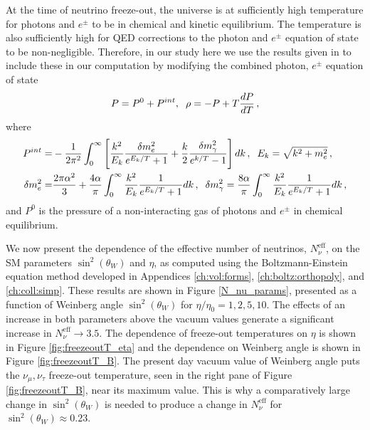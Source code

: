 At the time of neutrino freeze-out, the universe is at sufficiently high temperature for photons and $e^\pm$ to be in chemical and kinetic equilibrium.  The temperature is also sufficiently high for QED corrections to the photon and $e^\pm$ equation of state to be non-negligible.  Therefore, in our study here we use the results given in \cite{Heckler:1994tv,Mangano:2001iu} to include these in our computation by modifying the combined photon, $e^\pm$ equation of state
\begin{align}
P=P^0+P^{int},\hspace{2mm} \rho=-P+T\frac{dP}{dT}\,,
\end{align}
where
\begin{align}
P^{int}=&-\frac{1}{2\pi^2}\int_0^\infty\left[\frac{k^2}{E_k}\frac{\delta m_e^2}{e^{E_k/T}+1}+\frac{k}{2}\frac{\delta m_\gamma^2}{e^{k/T}-1}\right]dk\,,\hspace{2mm} E_k=\sqrt{k^2+m_e^2}\,,\\
\delta m_e^2=&\frac{2\pi\alpha^2}{3}+\frac{4\alpha}{\pi}\int_0^\infty \frac{k^2}{E_k}\frac{1}{e^{E_k/T}+1}dk\,,\hspace{2mm} \delta m_\gamma^2=\frac{8\alpha}{\pi}\int_0^\infty \frac{k^2}{E_k}\frac{1}{e^{E_k/T}+1}dk\,,
\end{align}
and $P^0$ is the pressure of a non-interacting gas of photons and $e^\pm$ in chemical equilibrium.

We now present the  dependence of the effective number of neutrinos, $N_\nu^{\mathrm{eff}}$, on  the SM parameters   $\sin^2(\theta_W)$ and $\eta$, as computed using the Boltzmann-Einstein equation method developed in Appendices \ref{ch:vol:forms}, \ref{ch:boltz:orthopoly}, and \ref{ch:coll:simp}. These results are shown in  Figure \ref{N_nu_params}, presented as a function of  Weinberg angle $\sin^2(\theta_W) $ for $\eta/\eta_0=1,2,5,10$. The effects of an increase in both parameters above the vacuum values generate a significant increase in  $N_\nu^{\mathrm{eff}}\to 3.5$.  The dependence of freeze-out temperatures on $\eta$ is shown in Figure \ref{fig:freezeoutT_eta} and the dependence on Weinberg angle is shown in Figure \ref{fig:freezeoutT_B}. The present day vacuum value of Weinberg angle puts the $\nu_\mu,\nu_\tau$ freeze-out temperature, seen in the right pane of Figure \ref{fig:freezeoutT_B},  near its maximum value.  This is why a comparatively large change in $\sin^2(\theta_W)$ is needed to produce a change in $N_\nu^{\mathrm{eff}}$ for $\sin^2(\theta_W)\approx0.23$.  
 
